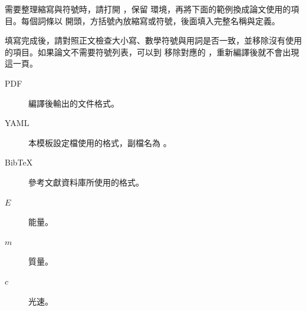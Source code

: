\begin{denotation}
需要整理縮寫與符號時，請打開 ，保留  環境，再將下面的範例換成論文使用的項目。每個詞條以 \code{\item} 開頭，方括號內放縮寫或符號，後面填入完整名稱與定義。

填寫完成後，請對照正文檢查大小寫、數學符號與用詞是否一致，並移除沒有使用的項目。如果論文不需要符號列表，可以到  移除對應的 \code{}，重新編譯後就不會出現這一頁。

\begin{description}
\item[PDF] 編譯後輸出的文件格式。
\item[YAML] 本模板設定檔使用的格式，副檔名為 。
\item[BibTeX] 參考文獻資料庫所使用的格式。
\item[$E$] 能量。
\item[$m$] 質量。
\item[$c$] 光速。
\end{description}
\end{denotation}
